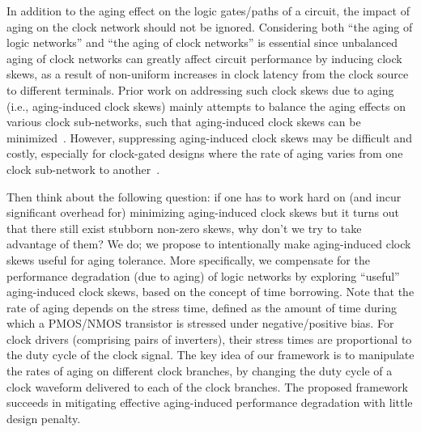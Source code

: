 In addition to the aging effect on the logic gates/paths of a circuit, the impact of aging on the clock network should not be ignored. Considering both \enquote{the aging of logic networks} and \enquote{the aging of clock networks} is essential since unbalanced aging of clock networks can greatly affect circuit performance by inducing clock skews, as a result of non-uniform increases in clock latency from the clock source to different terminals. Prior work on addressing such clock skews due to aging (i.e., aging-induced clock skews) mainly attempts to balance the aging effects on various clock sub-networks, such that aging-induced clock skews can be minimized~\cite{chen2013novel, huang2013low, chakraborty2013skew}. However, suppressing aging-induced clock skews may be difficult and costly, especially for clock-gated designs where the rate of aging varies from one clock sub-network to another~\cite{lai2014bti}.

Then think about the following question: if one has to work hard on (and incur significant overhead for) minimizing aging-induced clock skews but it turns out that there still exist stubborn non-zero skews, why don't we try to take advantage of them? We do; we propose to intentionally make aging-induced clock skews useful for aging tolerance. More specifically, we compensate for the performance degradation (due to aging) of logic networks by exploring \enquote{useful} aging-induced clock skews, based on the concept of time borrowing. Note that the rate of aging depends on the stress time, defined as the amount of time during which a PMOS/NMOS transistor is stressed under negative/positive bias. For clock drivers (comprising pairs of inverters), their stress times are proportional to the duty cycle of the clock signal. The key idea of our framework is to manipulate the rates of aging on different clock branches, by changing the duty cycle of a clock waveform delivered to each of the clock branches. The proposed framework succeeds in mitigating effective aging-induced performance degradation with little design penalty.